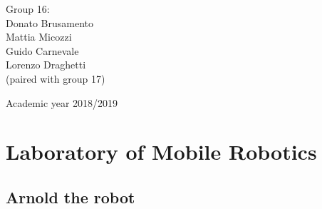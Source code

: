 \documentclass[a4paper,11pt,oneside]{book}
\begin{document}
			\begin{flushright}
				{\large Group 16:\\
					{Donato Brusamento\\
						Mattia Micozzi\\
						Guido Carnevale\\
						Lorenzo Draghetti\\}
					\vspace{3mm}
				{(paired with group 17)}}\\
			\end{flushright}
			\begin{center}
			\vfill
			      {\large Academic year \@2018/2019} \\
			\end{center}
			
			
			
			\newpage
			\thispagestyle{empty}
			
			
			
			\tableofcontents \thispagestyle{empty}
			\listoffigures\thispagestyle{empty}
			
			
			
			\chapter{Laboratory of Mobile Robotics}
			
			\section*{Arnold the robot}
			
\end{document}
